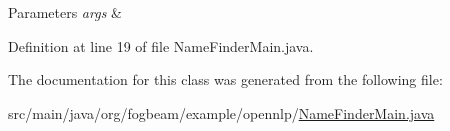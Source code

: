 \begin{DoxyParams}{Parameters}
{\em args} & \\
\hline
\end{DoxyParams}


Definition at line 19 of file Name\+Finder\+Main.\+java.



The documentation for this class was generated from the following file\+:\begin{DoxyCompactItemize}
\item 
src/main/java/org/fogbeam/example/opennlp/\hyperlink{_name_finder_main_8java}{Name\+Finder\+Main.\+java}\end{DoxyCompactItemize}
